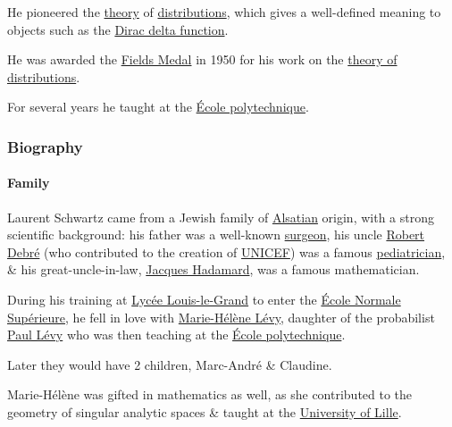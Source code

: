 \documentclass{article}
\begin{document}
He pioneered the \href{https://en.wikipedia.org/wiki/Theory}{theory} of \href{https://en.wikipedia.org/wiki/Distribution_(mathematics)}{distributions}, which gives a well-defined meaning to objects such as the \href{https://en.wikipedia.org/wiki/Dirac_delta_function}{Dirac delta function}.

He was awarded the \href{https://en.wikipedia.org/wiki/Fields_Medal}{Fields Medal} in 1950 for his work on the \href{https://en.wikipedia.org/wiki/Distribution_(mathematics)}{theory of distributions}.

For several years he taught at the \href{https://en.wikipedia.org/wiki/%C3%89cole_polytechnique}{École polytechnique}.

\subsubsection{Biography}

\paragraph{Family}
Laurent Schwartz came from a Jewish family of \href{https://en.wikipedia.org/wiki/Alsace}{Alsatian} origin, with a strong scientific background: his father was a well-known \href{https://en.wikipedia.org/wiki/Surgeon}{surgeon}, his uncle \href{https://en.wikipedia.org/wiki/Robert_Debr%C3%A9}{Robert Debré} (who contributed to the creation of \href{https://en.wikipedia.org/wiki/UNICEF}{UNICEF}) was a famous \href{https://en.wikipedia.org/wiki/Pediatrics}{pediatrician}, \& his great-uncle-in-law, \href{https://en.wikipedia.org/wiki/Jacques_Hadamard}{Jacques Hadamard}, was a famous mathematician.

%
During his training at \href{https://en.wikipedia.org/wiki/Lyc%C3%A9e_Louis-le-Grand}{Lycée Louis-le-Grand} to enter the \href{https://en.wikipedia.org/wiki/%C3%89cole_Normale_Sup%C3%A9rieure}{École Normale Supérieure}, he fell in love with \href{https://en.wikipedia.org/wiki/Marie-H%C3%A9l%C3%A8ne_Schwartz}{Marie-Hélène Lévy}, daughter of the probabilist \href{https://en.wikipedia.org/wiki/Paul_L%C3%A9vy_(mathematician)}{Paul Lévy} who was then teaching at the \href{https://en.wikipedia.org/wiki/%C3%89cole_polytechnique}{École polytechnique}.

Later they would have 2 children, Marc-André \& Claudine.

Marie-Hélène was gifted in mathematics as well, as she contributed to the geometry of singular analytic spaces \& taught at the \href{https://en.wikipedia.org/wiki/Universit%C3%A9_Lille_Nord_de_France}{University of Lille}.
\end{document}
